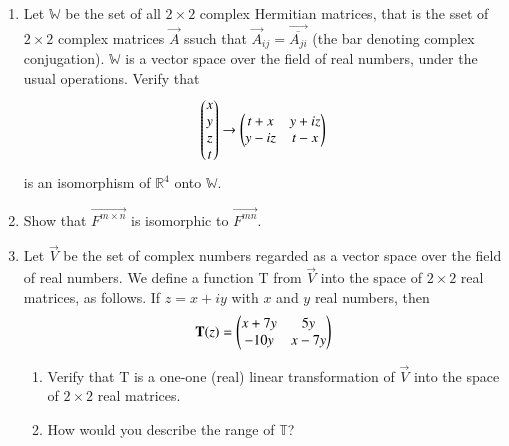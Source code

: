 \begin{enumerate}[label=\thesubsection.\arabic*.,ref=\thesubsection.\theenumi]
\begin{enumerate}
\solution

\end{enumerate}
%
\item Let $\mathbb{W}$ be the set of all $2\times2$ complex Hermitian matrices, that is the sset of $2\times2$ complex matrices $\vec{A}$ ssuch that $\vec{A}_{ij}=\vec{\overline{A_{ji}}}$ (the bar denoting complex conjugation). $\mathbb{W}$ is a vector space over the field of real numbers, under the usual operations. Verify that
\begin{align}\label{iso}
\begin{pmatrix}x\\y\\z\\t\end{pmatrix} \rightarrow \begin{pmatrix}t+x&y+iz\\y-iz&t-x\end{pmatrix}
\end{align}
is an isomorphism of $\mathbb{R}^4$ onto $\mathbb{W}$.
%
\\
\solution

\item Show that $\vec{F^{m\times n}}$ is isomorphic to $\vec{F^{mn}}$.
%
\\
\solution

\item Let $\vec{V}$ be the set of complex numbers regarded as a vector space over the field of real numbers. We define a function T from $\vec{V}$ into the space of $2 \times 2$ real matrices, as follows. If $z = x + iy$ with $x$ and $y$ real numbers, then
\begin{align}
    \mathbf{T}(z) = \begin{pmatrix}x + 7y & 5y \\ -10y & x-7y\end{pmatrix} \nonumber
\end{align}
\begin{enumerate}
\item  Verify that T is a one-one (real) linear transformation of $\vec{V}$ into the space of $2 \times 2$ real matrices.
%
\\
\solution

\item How would you describe the range of $\mathbb{T}$?
%
\\
\solution



\end{enumerate}
\end{enumerate}
